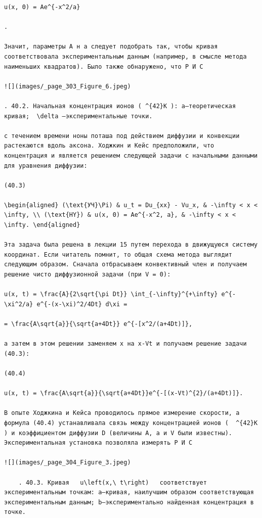 \documentclass[
  ukrainian,
]{article}
\begin{document}
\begin{verbatim}
u(x, 0) = Ae^{-x^2/a}

.

Значит, параметры A н a следует подобрать так, чтобы кривая соответствовала экспериментальным данным (например, в смысле метода наименьших квадратов). Было также обнаружено, что Р И С

![](images/_page_303_Figure_6.jpeg)

. 40.2. Начальная концентрация ионов ( ^{42}K ): a—теоретическая кривая;  \delta —экспериментальные точки.

с течением времени ноны поташа под действием диффузии и конвекции растекаются вдоль аксона. Ходжкин и Кейс предположили, что концентрация и является решением следующей задачи с начальными данными для уравнения диффузии:

(40.3) 

\begin{aligned} (\text{УЧ}\Pi) & u_t = Du_{xx} - Vu_x, & -\infty < x < \infty, \\ (\text{HY}) & u(x, 0) = Ae^{-x^2, a}, & -\infty < x < \infty. \end{aligned}

Эта задача была решена в лекции 15 путем перехода в движущуюся систему координат. Если читатель помнит, то общая схема метода выглядит следующим образом. Сначала отбрасываем конвективный член и получаем решение чисто диффузионной задачи (при V = 0):

u(x, t) = \frac{A}{2\sqrt{\pi Dt}} \int_{-\infty}^{+\infty} e^{-\xi^2/a} e^{-(x-\xi)^2/4Dt} d\xi =

= \frac{A\sqrt{a}}{\sqrt{a+4Dt}} e^{-[x^2/(a+4Dt)]},

а затем в этом решении заменяем x на x-Vt и получаем решение задачи (40.3):

(40.4)

u(x, t) = \frac{A\sqrt{a}}{\sqrt{a+4Dt}}e^{-[(x-Vt)^{2}/(a+4Dt)]}.

В опыте Ходжкина и Кейса проводилось прямое измерение скорости, а формула (40.4) устанавливала связь между концентрацией ионов (  ^{42}K  ) и коэффициентом диффузии D (величины A, a и V были известны). Экспериментальная установка позволяла измерять Р И С

![](images/_page_304_Figure_3.jpeg)

    . 40.3. Кривая   u\left(x,\ t\right)   соответствует экспериментальным точкам: a—кривая, наилучшим образом соответствующая экспериментальным данным; b—экспериментально найденная концентрация в точке.


\end{verbatim}
\end{document}
